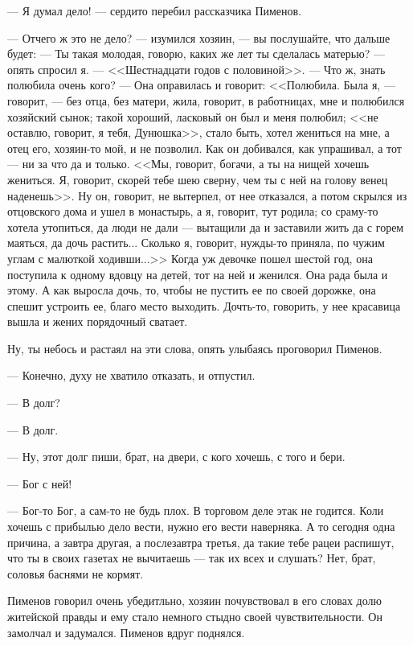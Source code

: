 --- Я думал дело! --- сердито перебил рассказчика Пименов.

--- Отчего ж это не дело? --- изумился хозяин, --- вы послушайте, что дальше будет: --- Ты такая молодая, говорю, каких же лет ты сделалась матерью? --- опять спросил я. --- <<Шестнадцати годов с половиной>>. --- Что ж, знать полюбила очень кого? --- Она оправилась и говорит: <<Полюбила. Была я, --- говорит, --- без отца, без матери, жила, говорит, в работницах, мне и полюбился хозяйский сынок; такой хороший, ласковый он был и меня полюбил; <<не оставлю, говорит, я тебя, Дунюшка>>, стало быть, хотел жениться на мне, а отец его, хозяин-то мой, и не позволил. Как он добивался, как упрашивал, а тот --- ни за что да и только. <<Мы, говорит, богачи, а ты на нищей хочешь жениться. Я, говорит, скорей тебе шею сверну, чем ты с ней на голову венец наденешь>>. Ну он, говорит, не вытерпел, от нее отказался, а потом скрылся из отцовского дома и ушел в монастырь, а я, говорит, тут родила; со сраму-то хотела утопиться, да люди не дали --- вытащили да и заставили жить да с горем маяться, да дочь растить... Сколько я, говорит, нужды-то приняла, по чужим углам с малюткой ходивши...>> Когда уж девочке пошел шестой год, она поступила к одному вдовцу на детей, тот на ней и женился. Она рада была и этому. А как выросла дочь, то, чтобы не пустить ее по своей дорожке, она спешит устроить ее, благо место выходить. Дочть-то, говорить, у нее красавица вышла и жених порядочный сватает.

Ну, ты небось и растаял на эти слова, опять улыбаясь проговорил Пименов.

--- Конечно, духу не хватило отказать, и отпустил.

--- В долг?

--- В долг.

--- Ну, этот долг пиши, брат, на двери, с кого хочешь, с того и бери.

--- Бог с ней!

--- Бог-то Бог, а сам-то не будь плох. В торговом деле этак не годится. Коли хочешь с прибылью дело вести, нужно его вести наверняка. А то сегодня одна причина, а завтра другая, а послезавтра третья, да такие тебе рацеи распишут, что ты в своих газетах не вычитаешь --- так их всех и слушать? Нет, брат, соловья баснями не кормят.

Пименов говорил очень убедитльно, хозяин почувствовал в его словах долю житейской правды и ему стало немного стыдно своей чувствительности. Он замолчал и задумался. Пименов вдруг поднялся.

